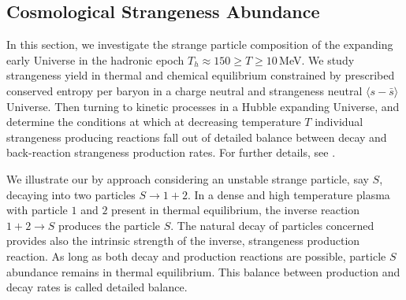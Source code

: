 \documentclass[universe,article,submit,moreauthors,pdftex,a4paper]{Definitions/mdpi}
\begin{document}
\subsection{Cosmological Strangeness Abundance}\label{sec:Strangeness}
\noindent In this section, we investigate the strange particle composition of the expanding early Universe in the hadronic epoch $T_h\approx 150\ge T\ge 10$\,MeV. We study strangeness yield in thermal and chemical equilibrium constrained by prescribed conserved entropy per baryon in a charge neutral and strangeness neutral $\langle s-\bar s\rangle$ Universe. Then turning to kinetic processes in a Hubble expanding Universe, and determine the
conditions at which at decreasing temperature $T$ individual strangeness producing reactions fall out of detailed balance between decay and back-reaction strangeness production rates. For further details, see \cite{Yang:2021bko}.

We illustrate our by approach considering an unstable strange particle, say $S$, decaying into two particles $S\rightarrow 1+2$. In a dense and high temperature plasma with particle $1$ and $2$ present in thermal equilibrium, the inverse reaction $1+2\rightarrow S$ produces the particle $S$. The natural decay of particles concerned provides also the intrinsic strength of the inverse, strangeness production reaction. As long as both decay and production reactions are possible, particle $S$ abundance remains in thermal equilibrium. This balance between production and decay rates is called detailed balance. 
\end{document}

